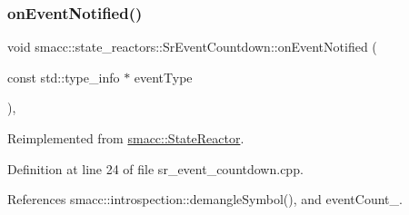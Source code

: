 \subsubsection{\texorpdfstring{on\+Event\+Notified()}{onEventNotified()}}
{\footnotesize\ttfamily void smacc\+::state\+\_\+reactors\+::\+Sr\+Event\+Countdown\+::on\+Event\+Notified (\begin{DoxyParamCaption}\item[{const std\+::type\+\_\+info $\ast$}]{event\+Type }\end{DoxyParamCaption})\hspace{0.3cm}{\ttfamily [override]}, {\ttfamily [virtual]}}



Reimplemented from \hyperlink{classsmacc_1_1StateReactor_a17646b3c68a6d80d1e4da8c14238ce36}{smacc\+::\+State\+Reactor}.



Definition at line 24 of file sr\+\_\+event\+\_\+countdown.\+cpp.



References smacc\+::introspection\+::demangle\+Symbol(), and event\+Count\+\_\+.


